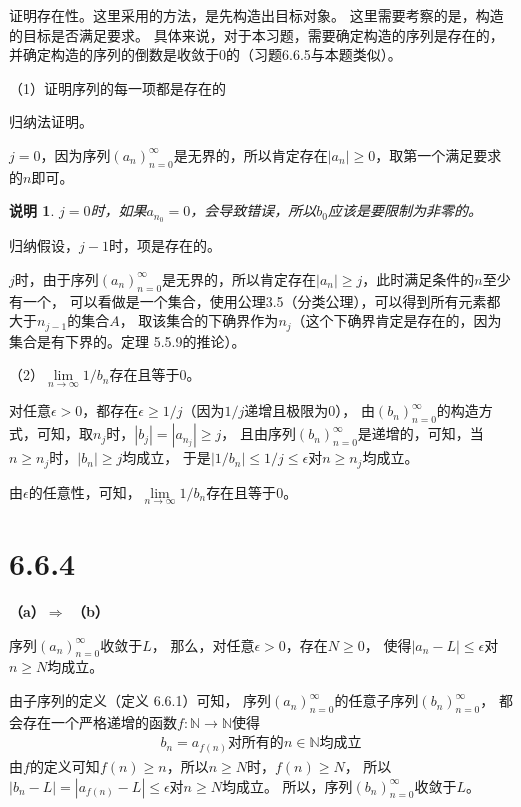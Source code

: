\documentclass{article}
\theoremstyle{mystyle}
\newtheorem*{zremark}{说明}
\begin{document}
证明存在性。这里采用的方法，是先构造出目标对象。
这里需要考察的是，构造的目标是否满足要求。
具体来说，对于本习题，需要确定构造的序列是存在的，并确定构造的序列的倒数是收敛于$0$的（习题6.6.5与本题类似）。

（1）证明序列的每一项都是存在的

归纳法证明。

$j=0$，因为序列$(a_n)_{n=0}^\infty$是无界的，所以肯定存在$|a_n| \geq 0$，取第一个满足要求的$n$即可。

\begin{zgraytheorem}
  \begin{zremark}
    $j=0$时，如果$a_{n_0}=0$，会导致错误，所以$b_0$应该是要限制为非零的。
  \end{zremark}
\end{zgraytheorem}

归纳假设，$j-1$时，项是存在的。

$j$时，由于序列$(a_n)_{n=0}^\infty$是无界的，所以肯定存在$|a_n| \geq j$，此时满足条件的$n$至少有一个，
可以看做是一个集合，使用公理3.5（分类公理），可以得到所有元素都大于$n_{j-1}$的集合$A$，
取该集合的下确界作为$n_j$（这个下确界肯定是存在的，因为集合是有下界的。定理 5.5.9的推论）。

（2）$\lim\limits_{n \rightarrow \infty}1/b_n$存在且等于$0$。

对任意$\epsilon > 0$，都存在$\epsilon \geq 1/j$（因为$1/j$递增且极限为$0$），
由$(b_n)_{n=0}^\infty$的构造方式，可知，取$n_j$时，$|b_j| = |a_{n_j}| \geq j$，
且由序列$(b_n)_{n=0}^\infty$是递增的，可知，当$n \geq n_j$时，$|b_n| \geq j$均成立，
于是$|1/b_n| \leq 1/j \leq \epsilon$对$n \geq n_j$均成立。

由$\epsilon$的任意性，可知，$\lim\limits_{n \rightarrow \infty}1/b_n$存在且等于$0$。

\section*{6.6.4}

\textbf{（a）$\Rightarrow$ （b）}

序列$(a_n)_{n=0}^\infty$收敛于$L$，
那么，对任意$\epsilon > 0$，存在$N \geq 0$，
使得$|a_n - L| \leq \epsilon$对$n \geq N$均成立。

由子序列的定义（定义 6.6.1）可知，
序列$(a_n)_{n=0}^\infty$的任意子序列$(b_n)_{n=0}^\infty$，
都会存在一个严格递增的函数$f : \mathbb{N} \rightarrow \mathbb{N}$使得
\begin{align*}
  b_n = a_{f(n)} \text{对所有的$n \in \mathbb{N}$均成立}
\end{align*}
由$f$的定义可知$f(n) \geq n$，所以$n \geq N$时，$f(n) \geq N$，
所以$|b_n - L| = |a_{f(n)} - L | \leq \epsilon$对$n \geq N$均成立。
所以，序列$(b_n)_{n=0}^\infty$收敛于$L$。
\end{document}
